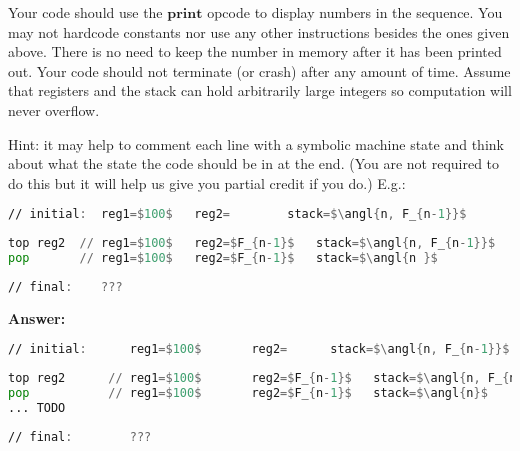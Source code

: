 \documentclass[11pt]{article}
\newcommand{\kw}[1]{\ensuremath{\mathbf{#1}}}
\DeclarePairedDelimiter\angl{\langle}{\rangle}
\begin{document}
\begin{enumerate}
Your code should use the \kw{print} opcode to display numbers in the sequence. You may not hardcode constants nor use any other instructions besides the ones given above. There is no need to keep the number in memory after it has been printed out.  Your code should not terminate (or crash) after any amount of time.  Assume that registers and the stack can hold arbitrarily large integers so computation will never overflow.

Hint: it may help to comment each line with a symbolic machine state and think about what the state the code should be in at the end.
(You are not required to do this but it will help us give you partial credit if you do.)
E.g.:

\begin{lstlisting}[language=asm, mathescape, numbers=none]
// initial:  reg1=$100$   reg2=        stack=$\angl{n, F_{n-1}}$
\end{lstlisting}
\begin{lstlisting}[language=asm, mathescape, firstnumber=100]
top reg2  // reg1=$100$   reg2=$F_{n-1}$   stack=$\angl{n, F_{n-1}}$
pop       // reg1=$100$   reg2=$F_{n-1}$   stack=$\angl{n }$
\end{lstlisting}
\begin{lstlisting}[language=asm, mathescape, numbers=none]
// final:    ???
\end{lstlisting}

\newpage

\textbf{Answer:}

\begin{lstlisting}[language=asm, mathescape, numbers=none]
// initial:      reg1=$100$       reg2=      stack=$\angl{n, F_{n-1}}$
\end{lstlisting}
\begin{lstlisting}[language=asm, mathescape, firstnumber=100]
top reg2      // reg1=$100$       reg2=$F_{n-1}$   stack=$\angl{n, F_{n-1}}$
pop           // reg1=$100$       reg2=$F_{n-1}$   stack=$\angl{n}$
... TODO
\end{lstlisting}
\begin{lstlisting}[language=asm, mathescape,numbers=none]
// final:        ???
\end{lstlisting}
\end{enumerate}
\end{document}
